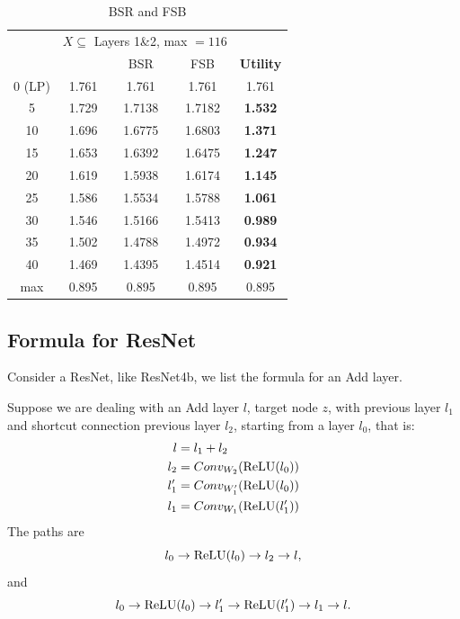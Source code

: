 {\begin{table}[h!]	
	\centering
	\begin{tabular}{|c||c|c|c|c|}
		\hline
		&\multicolumn{3}{c|}{$X \subseteq$ Layers 1\&2, max $=116$}\\\cline{2-5}
		\text{$|X|$} & \text{Random} &BSR &FSB &\bf Utility\\ \hline
		0  (LP) & 1.761  &  1.761& 1.761&1.761\\ \hline \hline
		5  & 1.729& 1.7138 & 1.7182 &\bf 1.532 \\ \hline
		10  & 1.696 & 1.6775&  1.6803&\bf  1.371\\ \hline
		15  &   1.653& 1.6392& 1.6475&\bf  1.247\\ \hline
		20  &   1.619 &1.5938 & 1.6174&\bf  1.145\\ \hline
		25  &    1.586 &1.5534 &1.5788 &\bf 1.061\\ \hline
		30  &  1.546 & 1.5166& 1.5413&\bf  0.989 \\ \hline
		35  &   1.502 & 1.4788 &1.4972 &\bf 0.934 \\ \hline
		40  &  1.469 & 1.4395& 1.4514&\bf 0.921 \\ \hline \hline
		max &  0.895 & 0.895 &0.895 &0.895   \\ \hline
	\end{tabular}
	\caption{BSR and FSB}
	\label{BSRandFSB}
\end{table}








\subsection*{Formula for ResNet}

Consider a ResNet, like ResNet4b, we list the formula for an Add layer.

Suppose we are dealing with an Add layer $l$, target node $z$, with previous layer $l_1$ and shortcut connection previous layer $l_2$, starting from a layer $l_0$, that is:
\begin{align*}
	l &= l_1+l_2\\
	l_2 &= Conv_{W_2}(\mathrm{ReLU}(l_0))\\
	l_1' &= Conv_{W'_1}(\mathrm{ReLU}(l_0))\\
	l_1 &= Conv_{W_1}(\mathrm{ReLU}(l'_{1}))
\end{align*}The paths are $$l_0\rightarrow \mathrm{ReLU}(l_0)\rightarrow l_2\rightarrow l,$$ and $$l_0\rightarrow \mathrm{ReLU}(l_0)\rightarrow l'_1\rightarrow \mathrm{ReLU}(l_1')\rightarrow l_1\rightarrow l.$$

}
